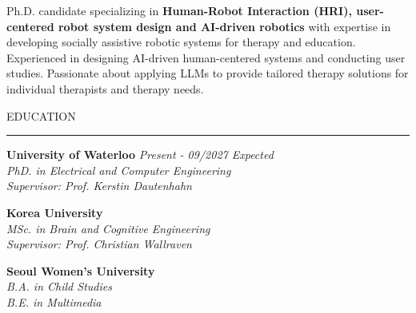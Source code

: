 \documentclass{resume} %
\renewenvironment{rSection}[1]{
\sectionskip
\textcolor{CarnegieMellonRed}{\MakeUppercase{#1}}
\sectionlineskip
\hrule
\begin{list}{}{
\setlength{\leftmargin}{1.5em}
}
\item[]
}{
\end{list}
}
\begin{document}
Ph.D. candidate specializing in \textbf{Human-Robot Interaction (HRI), user-centered robot system design and AI-driven robotics} with expertise in developing socially assistive robotic systems for therapy and education. Experienced in designing AI-driven human-centered systems and conducting user studies. Passionate about applying LLMs to provide tailored therapy solutions for individual therapists and therapy needs.

\begin{rSection}{Education}
{\bf University of Waterloo} \hfill {\em Present - 09/2027 Expected} \\
\emph{PhD. in Electrical and Computer Engineering} \hfill
\\ \emph{Supervisor: Prof. Kerstin Dautenhahn} \hfill

{\bf Korea University} \hfill
\\  \emph{MSc. in Brain and Cognitive Engineering}\hfill
\\ \emph{Supervisor: Prof. Christian Wallraven} \hfill

{\bf Seoul Women's University}
\\ \emph{B.A. in Child Studies}\hfill
\\  \emph{B.E. in Multimedia}

\end{rSection}
\end{document}
